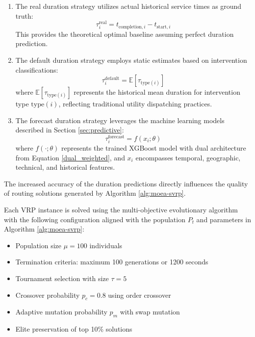 \documentclass[preprint,12pt]{elsarticle}
\begin{document}
\begin{enumerate}


\item  The {real duration} strategy utilizes actual historical service times as ground truth:
  \begin{equation}
  \tau_i^{\text{real}} = t_{\text{completion},i} - t_{\text{start},i}
  \end{equation}
  This provides the theoretical optimal baseline assuming perfect duration prediction.

\item  The {default duration} strategy employs static estimates based on intervention classifications:
  \begin{equation}
  \tau_i^{\text{default}} = \mathbb{E}[\tau_{\text{type}(i)}]
  \end{equation}
  where $\mathbb{E}[\tau_{\text{type}(i)}]$ represents the historical mean duration for intervention type $\text{type}(i)$, reflecting traditional utility
   dispatching practices.

 \item The {forecast duration} strategy leverages the machine learning models described in Section \ref{sec:predictive}:
  \begin{equation}
  \tau_i^{\text{forecast}} = f(x_i; \theta)
  \end{equation}
  where $f(\cdot; \theta)$ represents the trained XGBoost model with dual architecture from Equation \eqref{dual_weighted}, and $x_i$ encompasses temporal,
  geographic, technical, and historical features.
\end{enumerate}


  
  The increased accuracy of the duration predictions directly influences the quality of routing solutions generated by Algorithm \ref{alg:moea-svrp}.

  Each VRP instance is solved using the multi-objective evolutionary algorithm with the following configuration aligned with the population $P_t$ and
  parameters in Algorithm \ref{alg:moea-svrp}:


  \begin{itemize}
      \item Population size $\mu = 100$ individuals
      \item Termination criteria: maximum 100 generations or 1200 seconds
      \item Tournament selection with size $\tau = 5$
      \item Crossover probability $p_c = 0.8$ using order crossover
      \item Adaptive mutation probability $p_m$ with swap mutation
      \item Elite preservation of top 10\% solutions
  \end{itemize}
\end{document}
